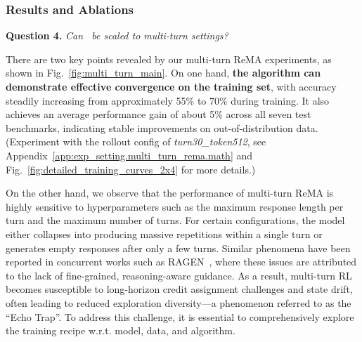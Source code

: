\subsubsection{Results and Ablations}
\label{sec:exp.multiturn.results}
\textbf{Question 4.} \textit{Can \method~be scaled to multi-turn settings?}

There are two key points revealed by our multi-turn ReMA experiments, as shown in Fig.~\ref{fig:multi_turn_main}. 
On one hand, \textbf{the algorithm can demonstrate effective convergence on the training set}, with accuracy steadily increasing from approximately 55\% to 70\% during training. 
It also achieves an average performance gain of about 5\% across all seven test benchmarks, indicating stable improvements on out-of-distribution data. (Experiment with the rollout config of \textit{turn30\_token512}, see Appendix~\ref{app:exp_setting.multi_turn_rema.math} and Fig.~\ref{fig:detailed_training_curves_2x4} for more details.)

On the other hand, we observe that the performance of multi-turn ReMA is highly sensitive to hyperparameters such as the maximum response length per turn and the maximum number of turns. 
For certain configurations, the model either collapses into producing massive repetitions within a single turn or generates empty responses after only a few turns. 
Similar phenomena have been reported in concurrent works such as RAGEN~\citep{wang2025ragen}, where these issues are attributed to the lack of fine-grained, reasoning-aware guidance. As a result, multi-turn RL becomes susceptible to long-horizon credit assignment challenges and state drift, often leading to reduced exploration diversity—a phenomenon referred to as the ``Echo Trap''. 
To address this challenge, it is essential to comprehensively explore the training recipe w.r.t. model, data, and algorithm.



